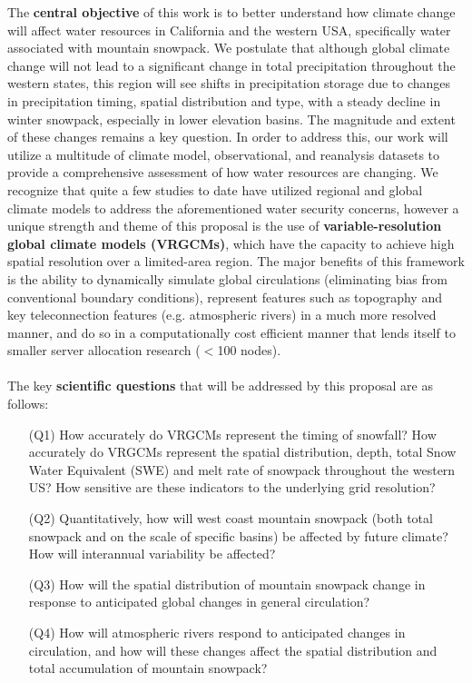 \documentclass[11pt]{article}
\begin{document}
The \textbf{central objective} of this work is to better understand how climate change will affect water resources in California and the western USA, specifically water associated with mountain snowpack.  We postulate that although global climate change will not lead to a significant change in total precipitation throughout the western states, this region will see shifts in precipitation storage due to changes in precipitation timing, spatial distribution and type, with a steady decline in winter snowpack, especially in lower elevation basins.  The magnitude and extent of these changes remains a key question.  In order to address this, our work will utilize a multitude of climate model, observational, and reanalysis datasets to provide a comprehensive assessment of how water resources are changing.  We recognize that quite a few studies to date have utilized regional and global climate models to address the aforementioned water security concerns, however a unique strength and theme of this proposal is the use of \textbf{variable-resolution global climate models (VRGCMs)}, which have the capacity to achieve high spatial resolution over a limited-area region.  The major benefits of this framework is the ability to dynamically simulate global circulations (eliminating bias from conventional boundary conditions), represent features such as topography and key teleconnection features (e.g. atmospheric rivers) in a much more resolved manner, and do so in a computationally cost efficient manner that lends itself to smaller server allocation research ($<$100 nodes). 
\\\\
The key \textbf{scientific questions} that will be addressed by this proposal are as follows:

\vspace{-0.4cm}
\begin{itemize}
\item[(Q1)] How accurately do VRGCMs represent the timing of snowfall?  How accurately do VRGCMs represent the spatial distribution, depth, total Snow Water Equivalent (SWE) and melt rate of snowpack throughout the western US?  How sensitive are these indicators to the underlying grid resolution?

\item[(Q2)] Quantitatively, how will west coast mountain snowpack (both total snowpack and on the scale of specific basins) be affected by future climate?  How will interannual variability be affected?

\item[(Q3)] How will the spatial distribution of mountain snowpack change in response to anticipated global changes in general circulation?

\item[(Q4)] How will atmospheric rivers respond to anticipated changes in circulation, and how will these changes affect the spatial distribution and total accumulation of mountain snowpack?
\end{itemize}
\end{document}
